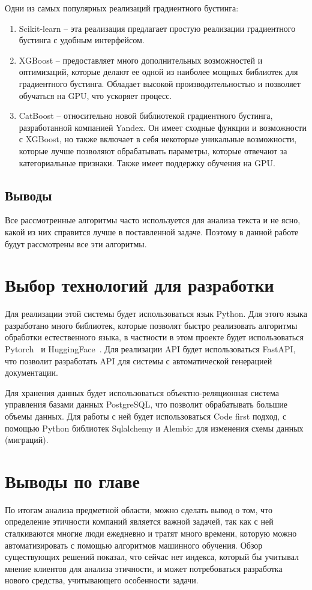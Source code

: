 \documentclass[PI, VKR]{HSEUniversity}
\begin{document}
Одни из самых популярных реализаций градиентного бустинга:
\begin{enumerate}
\item Scikit-learn -- эта реализация предлагает простую реализации градиентного бустинга с удобным интерфейсом.
\item XGBoost\autocite{chen_xgboost_2016} -- предоставляет много дополнительных возможностей и оптимизаций, которые делают ее одной из наиболее мощных библиотек для градиентного бустинга. Обладает высокой производительностью и позволяет обучаться на GPU\autocite{mitchell_accelerating_2017}, что ускоряет процесс.
\item CatBoost\autocite{prokhorenkova_catboost_2018} -- относительно новой библиотекой градиентного бустинга, разработанной компанией Yandex. Он имеет сходные функции и возможности с XGBoost, но также включает в себя некоторые уникальные возможности, которые лучше позволяют обрабатывать параметры, которые отвечают за категориальные признаки. Также имеет поддержку обучения на GPU\autocite{dorogush_catboost_2018}.
\end{enumerate}
\subsection{Выводы}
\label{sec:org8f07b6b}
Все рассмотренные алгоритмы часто используется для анализа текста и не ясно, какой из них справится лучше в поставленной задаче. Поэтому в данной работе будут рассмотрены все эти алгоритмы.
\section{Выбор технологий для разработки}
\label{sec:org61f31d9}
Для реализации этой системы будет использоваться язык Python\autocite{vanrossum_python_2009}. Для этого языка разработано много библиотек, которые позволят быстро реализовать алгоритмы обработки естественного языка, в частности в этом проекте будет использоваться Pytorch~\autocite{paszke_pytorch_2019} и HuggingFace~\autocite{wolf_transformers_2020}. Для реализации API будет использоваться FastAPI, что позволит разработать API для системы с автоматической генерацией документации.

Для хранения данных будет использоваться объектно-реляционная система управления базами данных PostgreSQL, что позволит обрабатывать большие объемы данных. Для работы с ней будет использоваться Code first подход, с помощью Python библиотек Sqlalchemy и Alembic для изменения схемы данных (миграций).
\section{Выводы по главе}
\label{sec:org0600beb}
По итогам анализа предметной области, можно сделать вывод о том, что определение этичности компаний является важной задачей, так как с ней сталкиваются многие люди ежедневно и тратят много времени, которую можно автоматизировать с помощью алгоритмов машинного обучения. Обзор существующих решений показал, что сейчас нет индекса, который бы учитывал мнение клиентов для анализа этичности, и может потребоваться разработка нового средства, учитывающего особенности задачи.
\end{document}
